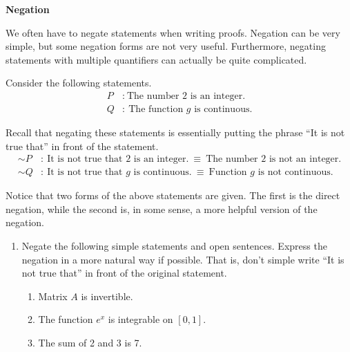 \documentclass[12 pt]{article}
\theoremstyle{definition}
\theoremstyle{plain}
\theoremstyle{mytheorem}
\theoremstyle{myexample}
\theoremstyle{mydefinition}
\begin{document}
\begin{center}
\textbf{Negation}
\end{center}

We often have to negate statements when writing proofs.  Negation can be very simple, but some negation forms are not very useful.  Furthermore, negating statements with multiple quantifiers can actually be quite complicated.

\begin{center}
\end{center}

\noindent Consider the following statements.
	\begin{align*}
	P &: \ \mbox{The number 2 is an integer.}\\
	Q &: \ \mbox{The function $g$ is continuous.}
	\end{align*}
	
Recall that negating these statements is essentially putting the phrase ``It is not true that'' in front of the statement.
	\begin{align*}
	\sim P &: \ \mbox{It is not true that 2 is an integer.} \ \equiv \ \mbox{The number 2 is not an integer.}\\
	\sim Q &: \ \mbox{It is not true that $g$ is continuous.} \ \equiv \ \mbox{Function $g$ is not continuous.}
	\end{align*}

Notice that two forms of the above statements are given.  The first is the direct negation, while the second is, in some sense, a more helpful version of the negation.

\begin{enumerate}
	\item Negate the following simple statements and open sentences.  Express the negation in a more natural way if possible.  That is, don't simple write ``It is not true that'' in front of the original statement.
	\begin{enumerate} \itemsep.5in
	\item Matrix $A$ is invertible.
	\item The function $e^x$ is integrable on $[0,1]$.
	\item The sum of 2 and 3 is 7.
	\vspace{.5in}
	\end{enumerate}
\end{enumerate}
\end{document}
